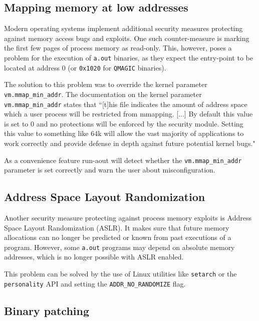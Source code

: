\documentclass{article}
\begin{document}
\subsection{Mapping memory at low addresses}
\label{explore_low_mmap}

Modern operating systems implement additional security measures protecting against memory access bugs and exploits. One such counter-measure is marking the first few pages of process memory as read-only. This, however, poses a problem for the execution of \texttt{a.out} binaries, as they expect the entry-point to be located at address 0 (or \texttt{0x1020} for \texttt{QMAGIC} binaries).

The solution to this problem was to override the kernel parameter \texttt{vm.mmap\_min\_addr}. The documentation on the kernel parameter \texttt{vm.mmap\_min\_addr}\cite{KernelParam1} states that ``[t]his file indicates the amount of address space which a user process will be restricted from mmapping. [...] By default this value is set to 0 and no protections will be enforced by the security module. Setting this value to something like 64k will allow the vast majority of applications to work correctly and provide defense in depth against future potential kernel bugs."

As a convenience feature run-aout will detect whether the \texttt{vm.mmap\_min\_addr} parameter is set correctly and warn the user about misconfiguration.

\subsection{Address Space Layout Randomization}
\label{explore_aslr}

Another security measure protecting against process memory exploits is Address Space Layout Randomization (ASLR). It makes sure that future memory allocations can no longer be predicted or known from past executions of a program. However, some \texttt{a.out} programs may depend on absolute memory addresses, which is no longer possible with ASLR enabled.

This problem can be solved by the use of Linux utilities like \texttt{setarch} or the \texttt{personality} API and setting the \texttt{ADDR\_NO\_RANDOMIZE} flag.

\subsection{Binary patching}
\label{explore_binpatch}
\end{document}
